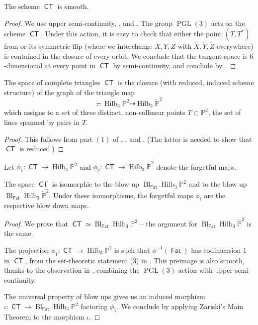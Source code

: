 \documentclass{article}
\renewcommand{\P}{\mathbb{P}}
\DeclareMathOperator{\PGL}{PGL}
\DeclareMathOperator{\Hilb}{Hilb}
\DeclareMathOperator{\CT}{\mathsf{CT}}
\newcommand{\from}{\colon}
\DeclareMathOperator{\Fat}{\mathsf{Fat}}
\DeclareMathOperator{\Bl}{Bl}
\begin{document}
\begin{theorem}
  \label{thm:smoothCT}
  The scheme $\CT$ is smooth.
\end{theorem}
\begin{proof}
  We use upper semi-continuity, , and
  . The group $\PGL(3)$ acts on the scheme
  $\CT$.  Under this action, it is easy to check that either the point
  $(T, T^{*})$ from  or its symmetric flip
  (where we interchange $X,Y,Z$ with $\check{X},\check{Y},\check{Z}$ everywhere) is contained
  in the closure of every orbit.  We conclude that the tangent space
  is $6$-dimensional at every point in $\CT$ by semi-continuity, and
  conclude by .
\end{proof}

\begin{corollary}\label{cor:closureofgraph}
  The space of complete triangles $\CT$ is the 
  closure (with reduced, induced scheme structure) of the graph of the
  triangle map
  \[
    \tau \from \Hilb_{3}\P^{2} \dashrightarrow \Hilb_{3}\check{\P}^{2}
  \]
  which assigns to a set of three distinct, non-collinear points
  $T \subset \P^{2}$, the set of lines spanned by pairs in $T$.
\end{corollary}

\begin{proof}
  This follows from part $(1)$ of ,
  , and .  (The latter
  is needed to show that $\CT$ is reduced.)
\end{proof}

Let $\phi_{1} \from \CT \to \Hilb_{3}\P^{2}$ and
$\phi_{2} \from \CT \to \Hilb_{3}\check{\P}^{2}$ denote the forgetful maps.
\begin{corollary}
  \label{cor:blow upfat}
  The space $\CT$ is isomorphic to the blow up
  $\Bl_{\Fat}\Hilb_{3}\P^{2}$ and to the blow up
  $\Bl_{\Fat}\Hilb_{3}\check{\P}^{2}$. Under these isomorphisms, the
  forgetful maps $\phi_{i}$ are the respective blow down maps.
\end{corollary}
\begin{proof}
  We prove that $\CT \simeq \Bl_{\Fat}\Hilb_{3}\P^{2}$ -- the argument
  for $\Bl_{\Fat}\Hilb_{3}\check{\P}^{2}$ is the same.

  The projection $\phi_{1} \from \CT \to \Hilb_{3}\P^{2}$ is such that
  $\phi^{-1}(\Fat)$ has codimension $1$ in $\CT$, from the set-theoretic statement (3) in .  This preimage is also smooth, thanks to the observation in , combining the $\PGL(3)$ action with upper semi-continuity.  
  
  The universal property of blow ups gives us an induced morphism
  $\iota \from \CT \to \Bl_{\Fat}\Hilb_{3}\P^{2}$ factoring
  $\phi_{1}$.  We conclude by applying  Zariski's Main Theorem to the
  morphism $\iota$.
\end{proof}
\end{document}
